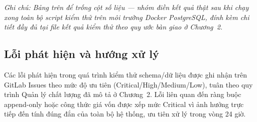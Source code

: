 \textit{Ghi chú: Bảng trên để trống cột số liệu — nhóm điền kết quả thật sau khi chạy xong toàn bộ script kiểm thử trên môi trường Docker PostgreSQL, đính kèm chi tiết đầy đủ tại file kết quả kiểm thử theo quy ước bàn giao ở Chương~2.}

\subsection{Lỗi phát hiện và hướng xử lý}
Các lỗi phát hiện trong quá trình kiểm thử schema/dữ liệu được ghi nhận trên GitLab Issues theo mức độ ưu tiên (Critical/High/Medium/Low), tuân theo quy trình Quản lý chất lượng đã mô tả ở Chương~2. Lỗi liên quan đến ràng buộc append-only hoặc công thức giá vốn được xếp mức Critical vì ảnh hưởng trực tiếp đến tính đúng đắn của toàn bộ hệ thống, ưu tiên xử lý trong vòng 24 giờ.
